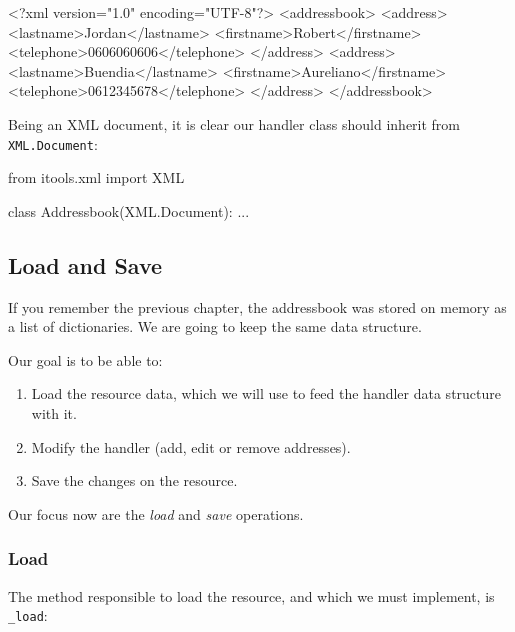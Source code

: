 \begin{code}
    <?xml version="1.0" encoding="UTF-8"?>
    <addressbook>
      <address>
        <lastname>Jordan</lastname>
        <firstname>Robert</firstname>
        <telephone>0606060606</telephone>
      </address>
      <address>
        <lastname>Buendia</lastname>
        <firstname>Aureliano</firstname>
        <telephone>0612345678</telephone>
      </address>
    </addressbook>
\end{code}

Being an XML document, it is clear our handler class should inherit from
{\tt XML.Document}:

\begin{code}
    from itools.xml import XML

    class Addressbook(XML.Document):
        ...
\end{code}


\subsection{Load and Save}

If you remember the previous chapter, the addressbook was stored on memory
as a list of dictionaries. We are going to keep the same data structure.

Our goal is to be able to:

\begin{enumerate}
  \item Load the resource data, which we will use to feed the handler data
    structure with it.

  \item Modify the handler (add, edit or remove addresses).

  \item Save the changes on the resource.
\end{enumerate}

Our focus now are the {\em load} and {\em save} operations.


\subsubsection{Load}

The method responsible to load the resource, and which we must implement,
is {\tt \_load}:


